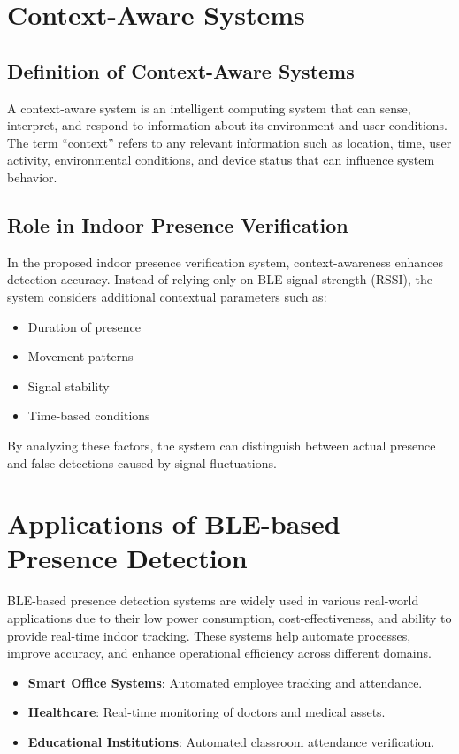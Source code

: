 \section{Context-Aware Systems}
\subsection{Definition of Context-Aware Systems}
A context-aware system is an intelligent computing system that can sense, interpret, and respond to information about its environment and user conditions. The term “context” refers to any relevant information such as location, time, user activity, environmental conditions, and device status that can influence system behavior. 

\subsection{Role in Indoor Presence Verification}
In the proposed indoor presence verification system, context-awareness enhances detection accuracy. Instead of relying only on BLE signal strength (RSSI), the system considers additional contextual parameters such as: 
\begin{itemize}
    \item Duration of presence 
    \item Movement patterns 
    \item Signal stability 
    \item Time-based conditions 
\end{itemize}
By analyzing these factors, the system can distinguish between actual presence and false detections caused by signal fluctuations.

\section{Applications of BLE-based Presence Detection}
BLE-based presence detection systems are widely used in various real-world applications due to their low power consumption, cost-effectiveness, and ability to provide real-time indoor tracking. These systems help automate processes, improve accuracy, and enhance operational efficiency across different domains.
\begin{itemize}
    \item \textbf{Smart Office Systems}: Automated employee tracking and attendance.
    \item \textbf{Healthcare}: Real-time monitoring of doctors and medical assets.
    \item \textbf{Educational Institutions}: Automated classroom attendance verification.
\end{itemize}

